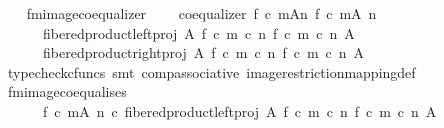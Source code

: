 \begin{isabellebody}
\isanewline
\ \ \isamarkupfalse%
\ f{\isacharunderscore}{\kern0pt}m{\isacharunderscore}{\kern0pt}image{\isacharunderscore}{\kern0pt}coequalizer{\isacharcolon}{\kern0pt}\isanewline
\ \ \ \ {\isachardoublequoteopen}coequalizer\ {\isacharparenleft}{\kern0pt}{\isacharparenleft}{\kern0pt}f\ {\isasymcirc}\isactrlsub c\ m{\isacharparenright}{\kern0pt}{\isasymlparr}A{\isasymrparr}\isactrlbsub n\isactrlesub {\isacharparenright}{\kern0pt}\ {\isacharparenleft}{\kern0pt}{\isacharparenleft}{\kern0pt}f\ {\isasymcirc}\isactrlsub c\ m{\isacharparenright}{\kern0pt}{\isasymrestriction}\isactrlbsub {\isacharparenleft}{\kern0pt}A{\isacharcomma}{\kern0pt}\ n{\isacharparenright}{\kern0pt}\isactrlesub {\isacharparenright}{\kern0pt}\ \isanewline
\ \ \ \ \ \ {\isacharparenleft}{\kern0pt}fibered{\isacharunderscore}{\kern0pt}product{\isacharunderscore}{\kern0pt}left{\isacharunderscore}{\kern0pt}proj\ A\ {\isacharparenleft}{\kern0pt}f\ {\isasymcirc}\isactrlsub c\ m\ {\isasymcirc}\isactrlsub c\ n{\isacharparenright}{\kern0pt}\ {\isacharparenleft}{\kern0pt}f\ {\isasymcirc}\isactrlsub c\ m\ {\isasymcirc}\isactrlsub c\ n{\isacharparenright}{\kern0pt}\ A{\isacharparenright}{\kern0pt}\ \isanewline
\ \ \ \ \ \ {\isacharparenleft}{\kern0pt}fibered{\isacharunderscore}{\kern0pt}product{\isacharunderscore}{\kern0pt}right{\isacharunderscore}{\kern0pt}proj\ A\ {\isacharparenleft}{\kern0pt}f\ {\isasymcirc}\isactrlsub c\ m\ {\isasymcirc}\isactrlsub c\ n{\isacharparenright}{\kern0pt}\ {\isacharparenleft}{\kern0pt}f\ {\isasymcirc}\isactrlsub c\ m\ {\isasymcirc}\isactrlsub c\ n{\isacharparenright}{\kern0pt}\ A{\isacharparenright}{\kern0pt}{\isachardoublequoteclose}\isanewline
\ \ \ \ \isamarkupfalse%
\ {\isacharparenleft}{\kern0pt}typecheck{\isacharunderscore}{\kern0pt}cfuncs{\isacharcomma}{\kern0pt}\ smt\ comp{\isacharunderscore}{\kern0pt}associative{}\ image{\isacharunderscore}{\kern0pt}restriction{\isacharunderscore}{\kern0pt}mapping{\isacharunderscore}{\kern0pt}def{}{\isacharparenright}{\kern0pt}\isanewline
\ \ \isamarkupfalse%
\ \isamarkupfalse%
\ f{\isacharunderscore}{\kern0pt}m{\isacharunderscore}{\kern0pt}image{\isacharunderscore}{\kern0pt}coequalises{\isacharcolon}{\kern0pt}\ \isanewline
\ \ \ \ \ \ {\isachardoublequoteopen}{\isacharparenleft}{\kern0pt}f\ {\isasymcirc}\isactrlsub c\ m{\isacharparenright}{\kern0pt}{\isasymrestriction}\isactrlbsub {\isacharparenleft}{\kern0pt}A{\isacharcomma}{\kern0pt}\ n{\isacharparenright}{\kern0pt}\isactrlesub \ {\isasymcirc}\isactrlsub c\ fibered{\isacharunderscore}{\kern0pt}product{\isacharunderscore}{\kern0pt}left{\isacharunderscore}{\kern0pt}proj\ A\ {\isacharparenleft}{\kern0pt}f\ {\isasymcirc}\isactrlsub c\ m\ {\isasymcirc}\isactrlsub c\ n{\isacharparenright}{\kern0pt}\ {\isacharparenleft}{\kern0pt}f\ {\isasymcirc}\isactrlsub c\ m\ {\isasymcirc}\isactrlsub c\ n{\isacharparenright}{\kern0pt}\ A\isanewline

\end{isabellebody}
